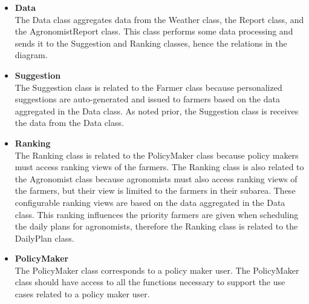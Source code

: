 \begin{flushleft}
\begin{itemize}
\item \textbf{Data}\\
The Data class aggregates data from the Weather class, the Report class, and the AgronomistReport class. This class performs some data processing and sends it to the Suggestion and Ranking classes, hence the relations in the diagram. 

\item \textbf{Suggestion}\\
The Suggestion class is related to the Farmer class because personalized suggestions are auto-generated and issued to farmers based on the data aggregated in the Data class. As noted prior, the Suggestion class is receives the data from the Data class. 

\item \textbf{Ranking}\\
The Ranking class is related to the PolicyMaker class because policy makers must access ranking views of the farmers. The Ranking class is also related to the Agronomist class because agronomists must also access ranking views of the farmers, but their view is limited to the farmers in their subarea. These configurable ranking views are based on the data aggregated in the Data class. This ranking influences the priority farmers are given when scheduling the daily plans for agronomists, therefore the Ranking class is related to the DailyPlan class.

\item \textbf{PolicyMaker}\\
The PolicyMaker class corresponds to a policy maker user. The PolicyMaker class should have access to all the functions necessary to support the use cases related to a policy maker user. 

\end{itemize}
\end{flushleft}



